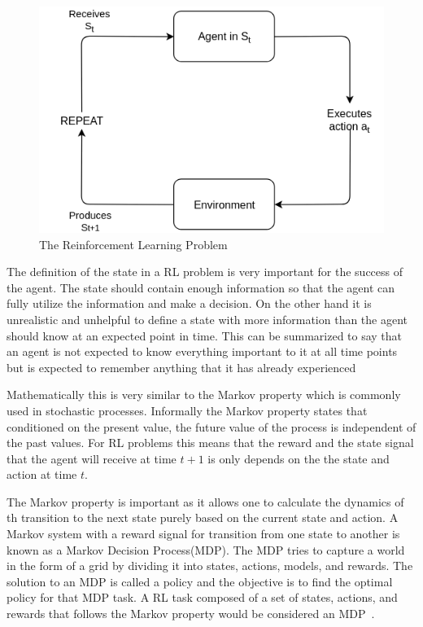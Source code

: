 \begin{figure}
	\centering
	\includegraphics[scale=0.50]{Images/Reinforcement_Learning}
	\caption{\label{fig:Reinforcement Learning} The Reinforcement Learning Problem } 
\end{figure}

The definition of the state in a RL problem is very important for the success of the agent. The state should contain enough information so that the agent can fully utilize the information and make a decision. On the other hand it is unrealistic and unhelpful to define a state with more information than the agent should know at an expected point in time. This can be summarized to say that an agent is not expected to know everything important to it at all time points but is expected to remember anything that it has already experienced~\cite{sutton2018reinforcement}

Mathematically this is very similar to the Markov property which is commonly used in stochastic processes. Informally  the Markov property states that conditioned on the present value, the future value of the process is independent of the past values. For RL problems this means that the reward and the state signal that the agent will receive at time $t+1$ is only depends on the the state and action at time $t$. 

The Markov property is important as it allows one to calculate the dynamics of th transition to the next state purely based on the current state and action. A Markov system with a reward signal for transition from one state to another is known as a Markov Decision Process(MDP). The MDP tries to capture a world in the form of a grid by dividing it into states, actions, models, and rewards. The solution to an MDP is called a policy and the objective is to find the optimal policy for that MDP task. A RL task composed of a set of states, actions, and rewards that follows the Markov property would be considered an MDP~\cite{van2012reinforcement}. 

